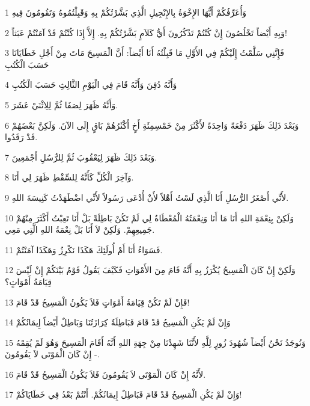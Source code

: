 \par 1 وَأُعَرِّفُكُمْ أَيُّهَا الإِخْوَةُ بِالإِنْجِيلِ الَّذِي بَشَّرْتُكُمْ بِهِ وَقَبِلْتُمُوهُ وَتَقُومُونَ فِيهِ
\par 2 وَبِهِ أَيْضاً تَخْلُصُونَ إِنْ كُنْتُمْ تَذْكُرُونَ أَيُّ كَلاَمٍ بَشَّرْتُكُمْ بِهِ. إِلاَّ إِذَا كُنْتُمْ قَدْ آمَنْتُمْ عَبَثاً!
\par 3 فَإِنَّنِي سَلَّمْتُ إِلَيْكُمْ فِي الأَوَّلِ مَا قَبِلْتُهُ أَنَا أَيْضاً: أَنَّ الْمَسِيحَ مَاتَ مِنْ أَجْلِ خَطَايَانَا حَسَبَ الْكُتُبِ
\par 4 وَأَنَّهُ دُفِنَ وَأَنَّهُ قَامَ فِي الْيَوْمِ الثَّالِثِ حَسَبَ الْكُتُبِ
\par 5 وَأَنَّهُ ظَهَرَ لِصَفَا ثُمَّ لِلِاثْنَيْ عَشَرَ.
\par 6 وَبَعْدَ ذَلِكَ ظَهَرَ دَفْعَةً وَاحِدَةً لأَكْثَرَ مِنْ خَمْسِمِئَةِ أَخٍ أَكْثَرُهُمْ بَاقٍ إِلَى الآنَ. وَلَكِنَّ بَعْضَهُمْ قَدْ رَقَدُوا.
\par 7 وَبَعْدَ ذَلِكَ ظَهَرَ لِيَعْقُوبَ ثُمَّ لِلرُّسُلِ أَجْمَعِينَ.
\par 8 وَآخِرَ الْكُلِّ كَأَنَّهُ لِلسِّقْطِ ظَهَرَ لِي أَنَا.
\par 9 لأَنِّي أَصْغَرُ الرُّسُلِ أَنَا الَّذِي لَسْتُ أَهْلاً لأَنْ أُدْعَى رَسُولاً لأَنِّي اضْطَهَدْتُ كَنِيسَةَ اللهِ.
\par 10 وَلَكِنْ بِنِعْمَةِ اللهِ أَنَا مَا أَنَا وَنِعْمَتُهُ الْمُعْطَاةُ لِي لَمْ تَكُنْ بَاطِلَةً بَلْ أَنَا تَعِبْتُ أَكْثَرَ مِنْهُمْ جَمِيعِهِمْ. وَلَكِنْ لاَ أَنَا بَلْ نِعْمَةُ اللهِ الَّتِي مَعِي.
\par 11 فَسَوَاءٌ أَنَا أَمْ أُولَئِكَ هَكَذَا نَكْرِزُ وَهَكَذَا آمَنْتُمْ.
\par 12 وَلَكِنْ إِنْ كَانَ الْمَسِيحُ يُكْرَزُ بِهِ أَنَّهُ قَامَ مِنَ الأَمْوَاتِ فَكَيْفَ يَقُولُ قَوْمٌ بَيْنَكُمْ إِنْ لَيْسَ قِيَامَةُ أَمْوَاتٍ؟
\par 13 فَإِنْ لَمْ تَكُنْ قِيَامَةُ أَمْوَاتٍ فَلاَ يَكُونُ الْمَسِيحُ قَدْ قَامَ!
\par 14 وَإِنْ لَمْ يَكُنِ الْمَسِيحُ قَدْ قَامَ فَبَاطِلَةٌ كِرَازَتُنَا وَبَاطِلٌ أَيْضاً إِيمَانُكُمْ
\par 15 وَنُوجَدُ نَحْنُ أَيْضاً شُهُودَ زُورٍ لِلَّهِ لأَنَّنَا شَهِدْنَا مِنْ جِهَةِ اللهِ أَنَّهُ أَقَامَ الْمَسِيحَ وَهُوَ لَمْ يُقِمْهُ - إِنْ كَانَ الْمَوْتَى لاَ يَقُومُونَ.
\par 16 لأَنَّهُ إِنْ كَانَ الْمَوْتَى لاَ يَقُومُونَ فَلاَ يَكُونُ الْمَسِيحُ قَدْ قَامَ.
\par 17 وَإِنْ لَمْ يَكُنِ الْمَسِيحُ قَدْ قَامَ فَبَاطِلٌ إِيمَانُكُمْ. أَنْتُمْ بَعْدُ فِي خَطَايَاكُمْ!
